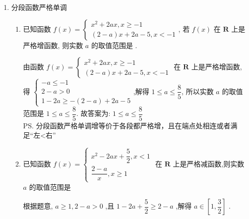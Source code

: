 \begin{enumerate}
\begin{enumerate}
\begin{jieda}
    \end{jieda}
    \item 函数$f(x)$为定义在$(-\infty, 0) \cup (0, +\infty)$上的奇函数，$f(2) = 1$，对于任意$x_1, x_2 \in (0, +\infty), x_1 \neq x_2$，都有$\dfrac{x_1f(x_1) - x_2f(x_2)}{x_1 - x_2} > 0$成立，则$f(x) \leq \dfrac{2}{x}$的解集为\blkda[3]{$(-\infty， -2] \cup (0, 2]$}.
    \item 设奇函数$f(x)$在$(0, +\infty)$上为增函数，且$f(1) = 0$，则不等式$\dfrac{f(x) - f(-x)}{x} < 0$的解集为.
\end{enumerate}
\item 分段函数严格单调
\begin{enumerate}
    \item 已知函数 $f(x)=\left\{\begin{array}{l}x^{2}+2 a x, x \geq-1 \\ (2-a) x+2 a-5, x<-1\end{array}\right.$, 若 $f(x)$ 在 $\mathbf{R}$ 上是严格增函数, 则实数 $a$ 的取值范围是 .
    \begin{jieda} 由函数 $f(x)=\left\{\begin{array}{l}x^{2}+2 a x, x \geq-1 \\ (2-a) x+2 a-5, x<-1\end{array}\right.$ 在 $\mathbf{R}$ 上是严格增函数, \\
    得 $\left\{\begin{array}{l}-a \leq-1 \\ 2-a>0 \\ 1-2 a \geq-(2-a)+2 a-5\end{array}\right.$,解得 $1 \leq a \leq \dfrac{8}{5}$,
    所以实数 $a$ 的取值范围是 $1 \leq a \leq \dfrac{8}{5}$.
    故答案为: $1 \leq a \leq \dfrac{8}{5}$ \\
    \ps 分段函数严格单调增等价于各段都严格增，且在端点处相连或者满足“左<右”
    \end{jieda}
    \item 已知函数 $f\left( x\right)  = \left\{  \begin{matrix} {x}^{2} - {2ax} + \dfrac{5}{2},x < 1 \\  \dfrac{2 - a}{x},x \geq  1 \end{matrix}\right.$ 在 $\mathbf{R}$ 上是严格减函数,则实数 $a$ 的取值范围是
    \begin{jieda}
        根据题意, $a \geq  1,2 - a > 0$ ,且 $1 - {2a} + \dfrac{5}{2} \geq  2 - a$ ,解得 $a \in  \left\lbrack  {1,\dfrac{3}{2}}\right\rbrack$ .

\end{jieda}
\end{enumerate}
\end{enumerate}
